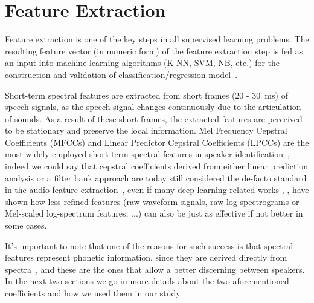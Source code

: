 \section{Feature Extraction}
\label{sec:feature_extraction}

Feature extraction is one of the key steps in all supervised learning problems. The resulting feature vector (in numeric form) of the feature extraction step is fed as an input into machine learning algorithms (K-NN, SVM, NB, etc.) for the construction and validation of classification/regression model~\cite{jahangir:review}.

Short-term spectral features are extracted from short frames (\num{20} - \SI{30}{ms}) of speech signals, as the speech signal changes continuously due to the articulation of sounds. As a result of these short frames, the extracted features are perceived to be stationary and preserve the local information. Mel Frequency Cepstral Coefficients (MFCCs) and Linear Predictor Cepstral Coefficients (LPCCs) are the most widely employed short-term spectral features in speaker identification~\cite{jahangir:review}, indeed we could say that cepstral coefficients derived from either linear prediction analysis or a filter bank approach are today still considered the de-facto standard in the audio feature extraction~\cite{rao:spectral}, even if many deep learning-related works \cite{si:sincnet}, \cite{si:lstm}, \cite{si:cnn} have shown how less refined features (raw waveform signals, raw log-spectrograms or Mel-scaled log-spectrum features, ...) can also be just as effective if not better in some cases.

It's important to note that one of the reasons for such success is that spectral features represent phonetic information, since they are derived directly from spectra~\cite{rao:spectral}, and these are the ones that allow a better discerning between speakers. In the next two sections we go in more details about the two aforementioned coefficients and how we used them in our study.




